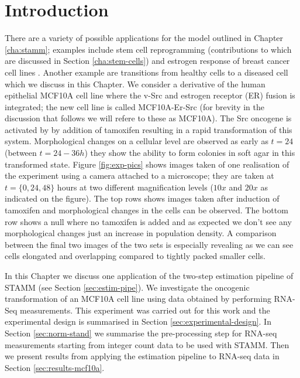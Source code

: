 
\section{Introduction}
\label{sec:introduction-mcf10}

There are a variety of possible applications for the model outlined in Chapter \ref{cha:stamm}; examples include stem cell reprogramming \citep{Armond:2013} (contributions to which are discussed in Section \ref{cha:stem-cells}) and estrogen response of breast cancer cell lines \citep{Casale:2013}. Another example are transitions from healthy cells to a diseased cell which we discuss in this Chapter. We consider a derivative of the human epithelial MCF10A cell line where the v-Src and estrogen receptor (ER) fusion is integrated; the new cell line is called MCF10A-Er-Src \citep{Hirsch:2010ec} (for brevity in the discussion that follows we will refere to these as MCF10A). The Src oncogene is activated by by addition of tamoxifen resulting in a rapid transformation of this system. Morphological changes on a cellular level are observed as early as $t=24$ (between $t=24-36h$) they show the ability to form colonies in soft agar \citep{Hirsch:2010ec} in this transformed state. Figure \ref{fig:exp-pics} shows images taken of one realisation of the experiment using a camera attached to a microscope; they are taken at $t= \lbrace 0, 24, 48 \rbrace$ hours at two different magnification levels ($10x$ and $20x$ as indicated on the figure). The top rows shows images taken after induction of tamoxifen and morphological changes in the cells can be observed. The bottom row shows a null where no tamoxifen is added and as expected we don't see any morphological changes just an increase in population density. A comparison between the final two images of the two sets is especially revealing as we can see cells elongated and overlapping compared to tightly packed smaller cells.

In this Chapter we discuss one application of the two-step estimation pipeline of STAMM (see Section \ref{sec:estim-pipe}). We investigate the oncogenic transformation of an MCF10A cell line using  data obtained by performing RNA-Seq measurements. This experiment was carried out for this work and the experimental design is summarised in Section \ref{sec:experimental-design}. In Section \ref{sec:norm-stand} we summarise the pre-processing step for RNA-seq measurements starting from integer count data to be used with STAMM. Then we present results from applying the estimation pipeline to RNA-seq data in Section \ref{sec:results-mcf10a}.

